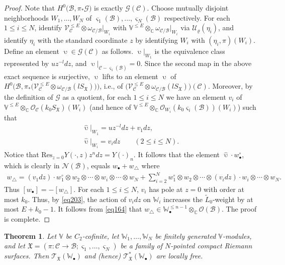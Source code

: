 \documentclass[12pt,a4paper,notitlepage]{report}
\theoremstyle{definition}
\theoremstyle{plain}
\newtheorem{thm}[df]{Theorem}
\newcommand{\fk}{\mathfrak}
\newcommand{\mc}{\mathcal}
\newcommand{\wtd}{\widetilde}
\newcommand{\wht}{\widehat}
\newcommand{\Res}{\mathrm{Res}}
\newcommand{\scr}{\mathscr}
\newcommand{\sgm}{\varsigma}
\newcommand{\blt}{\bullet}
\newcommand{\Vbb}{\mathbb V}
\newcommand{\Wbb}{\mathbb W}
\newcommand{\Cbb}{\mathbb C}
\numberwithin{equation}{section}
\begin{document}
\begin{proof}
Note that $H^0\big(\mc B,\pi_*\scr G\big)$ is exactly $\scr G(\mc C)$. Choose mutually disjoint neighborhoods $W_1,\dots,W_N$ of $\sgm_1(\mc B),\dots,\sgm_N(\mc B)$ respectively. For each $1\leq i\leq N$, identify $\scr V_{\mc C}^{\leq E}\otimes\omega_{\mc C/\mc B}|_{W_i}$ with $\Vbb^{\leq E}\otimes_\Cbb\omega_{\mc C/\mc B}|_{W_i}$ via $\mc U_\varrho(\eta_i)$, and identify $\eta_i$ with the standard coordinate $z$ by identifying $W_i$ with $(\eta_i,\pi)(W_i)$. Define an element $\upupsilon\in\scr G(\mc C)$ as follows. $\upupsilon|_{W_1}$ is the equivalence class represented by $uz^{-l}dz$, and $\upupsilon|_{\mc C-\sgm_1(\mc B)}=0$. Since the second map in the above exact sequence is surjective, $\upupsilon$ lifts to an element $\wht\upupsilon$ of $H^0\big(\mc B,\pi_*\big(\scr V_{\mc C}^{\leq E}\otimes\omega_{\mc C/\mc B}(lS_{\fk X})\big)\big)$, i.e., of $\big(\scr V_{\mc C}^{\leq E}\otimes\omega_{\mc C/\mc B}(lS_{\fk X})\big)(\mc C)$. Moreover, by the definition of $\scr G$ as a quotient, for each $1\leq i\leq N$ we have an element $v_i$ of $\Vbb^{\leq E}\otimes_\Cbb\scr O_{\mc C}(k_0 S_{\fk X})(W_i)$ (and hence of $\Vbb^{\leq E}\otimes_\Cbb\scr O_{W_i}(k_0 \sgm_i(\mc B))(W_i)$) such that
\begin{gather*}
\wht\upupsilon|_{W_1}=uz^{-l}dz+v_1dz,\\
\wht\upupsilon|_{W_i}=v_idz\qquad(2\leq i\leq N).
\end{gather*}
Notice that $\Res_{z=0}Y(\cdot,z)z^ndz=Y(\cdot)_n$. It follows that the element $\wht\upupsilon\cdot w_\blt^\circ$, which is clearly in $\scr N(\mc B)$,  equals $w_\blt+w_\triangle$ where
\begin{align*}
w_\triangle=(v_1dz)\cdot w_1^\circ\otimes w_2\otimes\cdots \otimes  w_i\otimes\cdots\otimes w_N+\sum_{i=2}^Nw_1^\circ\otimes w_2\otimes\cdots \otimes (v_idz)\cdot w_i\otimes\cdots\otimes w_N.
\end{align*}
Thus $[w_\blt]=-[w_\triangle]$. For each $1\leq i\leq N$, $v_i$ has pole at $z=0$ with order at most $k_0$. Thus, by \eqref{eq203}, the action of $v_idz$ on $\Wbb_i$ increases the $\wtd L_0$-weight by at most $E+k_0-1$. It follows from \eqref{eq164} that $w_\triangle\in\Wbb_\blt^{\leq {n-1}}\otimes_\Cbb\scr O(\mc B)$. The proof is complete.
\end{proof}


\begin{thm}\label{lb68}
Let $\Vbb$ be $C_2$-cofinite, let $\Wbb_1,\dots,\Wbb_N$ be finitely generated $\Vbb$-modules, and let $\fk X=(\pi:\mc C\rightarrow\mc B;\sgm_1,\dots,\sgm_N)$ be a family of $N$-pointed compact Riemann surfaces. Then $\scr T_{\fk X}(\Wbb_\blt)$ and (hence) $\scr T_{\fk X}^*(\Wbb_\blt)$ are locally free. 
\end{thm}
\end{document}
